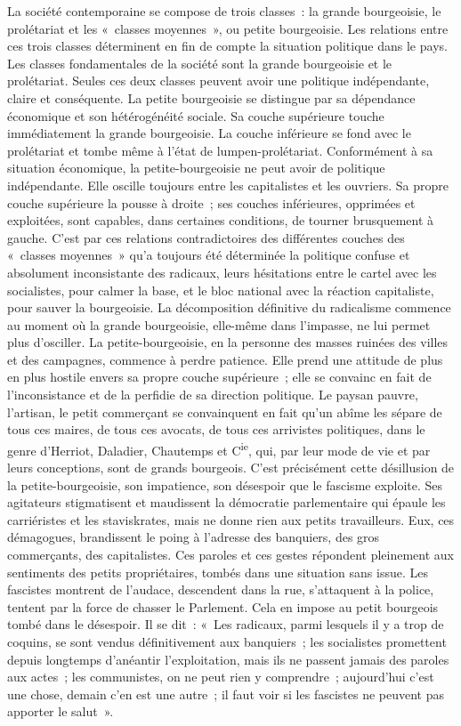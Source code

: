 \documentclass[french,twoside]{book} %
\begin{document}
La société contemporaine se compose de trois classes : la  grande bourgeoisie, le prolétariat et les « classes moyennes », ou petite bourgeoisie. Les relations entre ces trois classes déterminent en fin de compte la situation politique dans le pays. Les classes fondamentales de la société sont la grande bourgeoisie et le prolétariat. Seules ces deux classes peuvent avoir une politique indépendante, claire et conséquente. La petite bourgeoisie se distingue par sa dépendance économique et son hétérogénéité sociale. Sa couche supérieure touche immédiatement la grande bourgeoisie. La couche inférieure se fond avec le prolétariat et tombe même à l’état de lumpen-prolétariat. Conformément à sa situation économique, la petite-bourgeoisie ne peut avoir de politique indépendante. Elle oscille toujours entre les capitalistes et les ouvriers. Sa propre couche supérieure la pousse à droite ; ses couches inférieures, opprimées et exploitées, sont capables, dans certaines conditions, de tourner brusquement à gauche. C’est par ces relations contradictoires des différentes couches des « classes moyennes » qu’a toujours été déterminée la politique confuse et absolument inconsistante des radicaux, leurs hésitations entre le cartel avec les socialistes, pour calmer la base, et le bloc national avec la réaction capitaliste, pour sauver la bourgeoisie. La décomposition définitive du radicalisme commence au moment où la grande bourgeoisie, elle-même dans l’impasse, ne lui permet plus d’osciller. La petite-bourgeoisie, en la personne des masses ruinées des villes et des campagnes, commence à perdre patience. Elle prend une attitude de plus en plus hostile envers sa propre couche supérieure ; elle se convainc en fait de l’inconsistance et de la perfidie de sa direction politique. Le paysan pauvre, l’artisan, le petit commerçant se convainquent en fait qu’un abîme les sépare de tous ces maires, de tous ces avocats, de tous ces arrivistes politiques, dans le genre d’Herriot, Daladier, Chautemps et C\textsuperscript{ie}, qui,  par leur mode de vie et par leurs conceptions, sont de grands bourgeois. C’est précisément cette désillusion de la petite-bourgeoisie, son impatience, son désespoir que le fascisme exploite. Ses agitateurs stigmatisent et maudissent la démocratie parlementaire qui épaule les carriéristes et les staviskrates, mais ne donne rien aux petits travailleurs. Eux, ces démagogues, brandissent le poing à l’adresse des banquiers, des gros commerçants, des capitalistes. Ces paroles et ces gestes répondent pleinement aux sentiments des petits propriétaires, tombés dans une situation sans issue. Les fascistes montrent de l’audace, descendent dans la rue, s’attaquent à la police, tentent par la force de chasser le Parlement. Cela en impose au petit bourgeois tombé dans le désespoir. Il se dit : « Les radicaux, parmi lesquels il y a trop de coquins, se sont vendus définitivement aux banquiers ; les socialistes promettent depuis longtemps d’anéantir l’exploitation, mais ils ne passent jamais des paroles aux actes ; les communistes, on ne peut rien y comprendre ; aujourd’hui c’est une chose, demain c’en est une autre ; il faut voir si les fascistes ne peuvent pas apporter le salut ».
\end{document}
